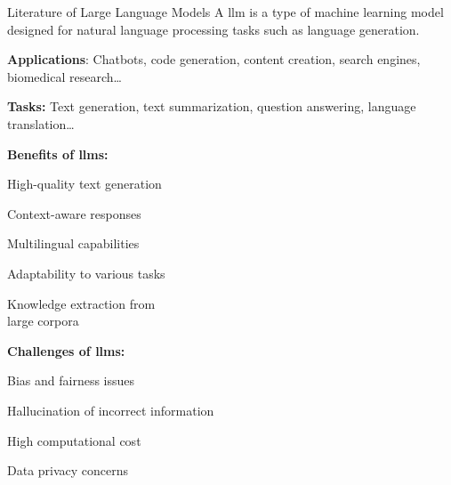 \begin{tframe}{Literature of Large Language Models}
    A \gls{llm} is a type of machine learning model designed for natural language processing tasks such as language generation.
    \vspace{0.2cm}

    \textbf{Applications}: Chatbots, code generation, content creation, search engines, biomedical research\ldots
    \vspace{0.1cm}

    \textbf{Tasks:} Text generation, text summarization, question answering, language translation\ldots
    \vspace{0.1cm}

    \begin{minipage}[t]{.5\linewidth}
        \textbf{Benefits of \glspl{llm}:}
        \begin{adv}
            \item High-quality text generation
            \item Context-aware responses
            \item Multilingual capabilities
            \item Adaptability to various tasks
            \item Knowledge extraction from\\large corpora
        \end{adv}
    \end{minipage}%
    \hfill%
    \begin{minipage}[t]{.5\linewidth}
        \textbf{Challenges of \glspl{llm}:}
        \begin{disadv}
            \item Bias and fairness issues
            \item Hallucination of incorrect information
            \item High computational cost
            \item Data privacy concerns
        \end{disadv}
    \end{minipage}
\end{tframe}